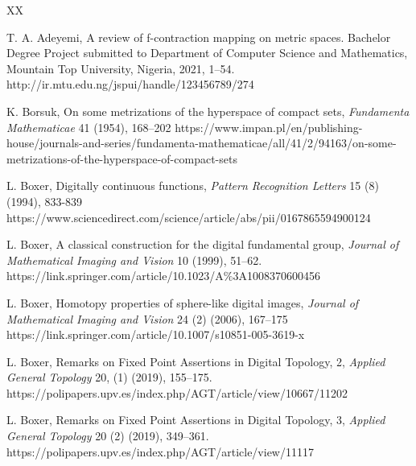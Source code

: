 \documentclass{article}
\numberwithin{thm}{section}
\begin{document}
\begin{thebibliography}{XX}

T. A. Adeyemi, A review of f-contraction mapping on metric spaces. 
Bachelor Degree Project submitted to 
Department of Computer Science and Mathematics, 
Mountain Top University, Nigeria, 2021, 1--54. 
\newline
http://ir.mtu.edu.ng/jspui/handle/123456789/274

K. Borsuk, On some metrizations of the hyperspace of compact sets, 
{\em Fundamenta Mathematicae} 41 (1954), 168--202
\newline
https://www.impan.pl/en/publishing-house/journals-and-series/fundamenta-mathematicae/all/41/2/94163/on-some-metrizations-of-the-hyperspace-of-compact-sets 

L. Boxer, Digitally continuous functions,
{\em Pattern Recognition Letters}
15 (8) (1994), 833-839
\newline
https://www.sciencedirect.com/science/article/abs/pii/0167865594900124

L. Boxer, A classical construction for the digital fundamental group, 
{\em Journal of Mathematical Imaging and Vision} 10 (1999),
51--62.
\newline
https://link.springer.com/article/10.1023/A$\%$3A1008370600456

L. Boxer,
Homotopy properties of
sphere-like digital images,
{\em Journal of Mathematical
Imaging and Vision} 24 (2) (2006),
167--175
\newline
https://link.springer.com/article/10.1007/s10851-005-3619-x 

L. Boxer, 
Remarks on Fixed Point Assertions in Digital Topology, 2, 
{\em Applied General Topology} 20, (1) (2019), 155--175.
\newline
https://polipapers.upv.es/index.php/AGT/article/view/10667/11202

L. Boxer, Remarks on Fixed Point Assertions in Digital Topology, 3,
{\em Applied General Topology} 20 (2) (2019), 349--361. 
\newline
https://polipapers.upv.es/index.php/AGT/article/view/11117


\end{thebibliography}
\end{document}
